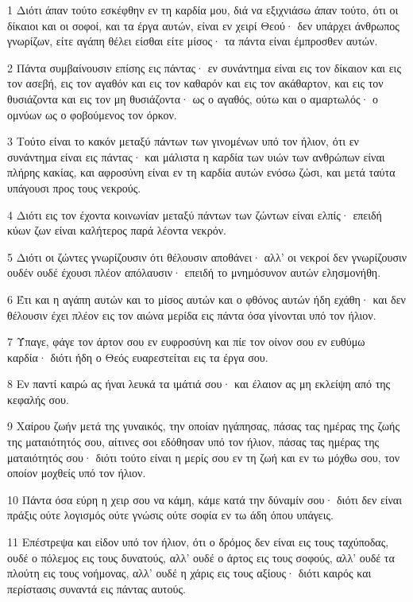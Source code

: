 \par 1 Διότι άπαν τούτο εσκέφθην εν τη καρδία μου, διά να εξιχνιάσω άπαν τούτο, ότι οι δίκαιοι και οι σοφοί, και τα έργα αυτών, είναι εν χειρί Θεού· δεν υπάρχει άνθρωπος γνωρίζων, είτε αγάπη θέλει είσθαι είτε μίσος· τα πάντα είναι έμπροσθεν αυτών.
\par 2 Πάντα συμβαίνουσιν επίσης εις πάντας· εν συνάντημα είναι εις τον δίκαιον και εις τον ασεβή, εις τον αγαθόν και εις τον καθαρόν και εις τον ακάθαρτον, και εις τον θυσιάζοντα και εις τον μη θυσιάζοντα· ως ο αγαθός, ούτω και ο αμαρτωλός· ο ομνύων ως ο φοβούμενος τον όρκον.
\par 3 Τούτο είναι το κακόν μεταξύ πάντων των γινομένων υπό τον ήλιον, ότι εν συνάντημα είναι εις πάντας· και μάλιστα η καρδία των υιών των ανθρώπων είναι πλήρης κακίας, και αφροσύνη είναι εν τη καρδία αυτών ενόσω ζώσι, και μετά ταύτα υπάγουσι προς τους νεκρούς.
\par 4 Διότι εις τον έχοντα κοινωνίαν μεταξύ πάντων των ζώντων είναι ελπίς· επειδή κύων ζων είναι καλήτερος παρά λέοντα νεκρόν.
\par 5 Διότι οι ζώντες γνωρίζουσιν ότι θέλουσιν αποθάνει· αλλ' οι νεκροί δεν γνωρίζουσιν ουδέν ουδέ έχουσι πλέον απόλαυσιν· επειδή το μνημόσυνον αυτών ελησμονήθη.
\par 6 Έτι και η αγάπη αυτών και το μίσος αυτών και ο φθόνος αυτών ήδη εχάθη· και δεν θέλουσιν έχει πλέον εις τον αιώνα μερίδα εις πάντα όσα γίνονται υπό τον ήλιον.
\par 7 Ύπαγε, φάγε τον άρτον σου εν ευφροσύνη και πίε τον οίνον σου εν ευθύμω καρδία· διότι ήδη ο Θεός ευαρεστείται εις τα έργα σου.
\par 8 Εν παντί καιρώ ας ήναι λευκά τα ιμάτιά σου· και έλαιον ας μη εκλείψη από της κεφαλής σου.
\par 9 Χαίρου ζωήν μετά της γυναικός, την οποίαν ηγάπησας, πάσας τας ημέρας της ζωής της ματαιότητός σου, αίτινες σοι εδόθησαν υπό τον ήλιον, πάσας τας ημέρας της ματαιότητός σου· διότι τούτο είναι η μερίς σου εν τη ζωή και εν τω μόχθω σου, τον οποίον μοχθείς υπό τον ήλιον.
\par 10 Πάντα όσα εύρη η χειρ σου να κάμη, κάμε κατά την δύναμίν σου· διότι δεν είναι πράξις ούτε λογισμός ούτε γνώσις ούτε σοφία εν τω άδη όπου υπάγεις.
\par 11 Επέστρεψα και είδον υπό τον ήλιον, ότι ο δρόμος δεν είναι εις τους ταχύποδας, ουδέ ο πόλεμος εις τους δυνατούς, αλλ' ουδέ ο άρτος εις τους σοφούς, αλλ' ουδέ τα πλούτη εις τους νοήμονας, αλλ' ουδέ η χάρις εις τους αξίους· διότι καιρός και περίστασις συναντά εις πάντας αυτούς.
